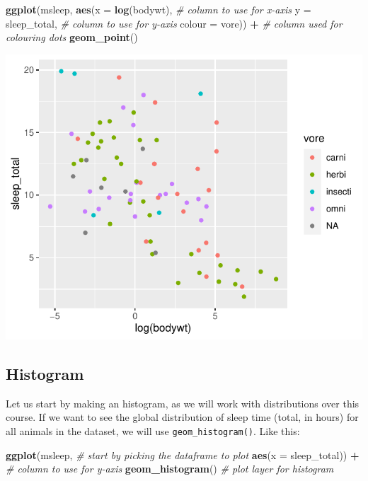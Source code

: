 \documentclass[
]{book}
\newenvironment{Shaded}{\begin{snugshade}}{\end{snugshade}}
\newcommand{\AttributeTok}[1]{\textcolor[rgb]{0.13,0.29,0.53}{#1}}
\newcommand{\CommentTok}[1]{\textcolor[rgb]{0.56,0.35,0.01}{\textit{#1}}}
\newcommand{\FunctionTok}[1]{\textcolor[rgb]{0.13,0.29,0.53}{\textbf{#1}}}
\newcommand{\NormalTok}[1]{#1}
\newcommand{\SpecialCharTok}[1]{\textcolor[rgb]{0.81,0.36,0.00}{\textbf{#1}}}
\begin{document}
\begin{Shaded}
\begin{Highlighting}[]
\FunctionTok{ggplot}\NormalTok{(msleep,                    }
       \FunctionTok{aes}\NormalTok{(}\AttributeTok{x =} \FunctionTok{log}\NormalTok{(bodywt),            }\CommentTok{\# column to use for x{-}axis}
           \AttributeTok{y =}\NormalTok{ sleep\_total,            }\CommentTok{\# column to use for y{-}axis}
           \AttributeTok{colour =}\NormalTok{ vore)) }\SpecialCharTok{+}           \CommentTok{\# column used for colouring dots}
  \FunctionTok{geom\_point}\NormalTok{() }
\end{Highlighting}
\end{Shaded}

\includegraphics{_main_files/figure-latex/unnamed-chunk-20-1.pdf}

\hypertarget{histogram}{%
\subsection*{Histogram}\label{histogram}}

Let us start by making an histogram, as we will work with distributions over this course.
If we want to see the global distribution of sleep time (total, in hours) for all animals in the dataset, we will use \texttt{geom\_histogram()}.
Like this:

\begin{Shaded}
\begin{Highlighting}[]
\FunctionTok{ggplot}\NormalTok{(msleep,                    }\CommentTok{\# start by picking the dataframe to plot}
       \FunctionTok{aes}\NormalTok{(}\AttributeTok{x =}\NormalTok{ sleep\_total)) }\SpecialCharTok{+}    \CommentTok{\# column to use for y{-}axis}
  \FunctionTok{geom\_histogram}\NormalTok{()                }\CommentTok{\# plot layer for histogram}
\end{Highlighting}
\end{Shaded}
\end{document}
